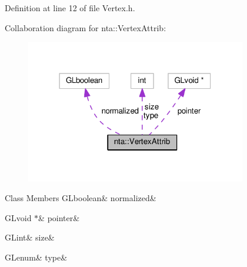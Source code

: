 Definition at line 12 of file Vertex.\+h.



Collaboration diagram for nta\+:\+:Vertex\+Attrib\+:\nopagebreak
\begin{figure}[H]
\begin{center}
\leavevmode
\includegraphics[width=273pt]{d6/d7d/structnta_1_1VertexAttrib__coll__graph}
\end{center}
\end{figure}
\begin{DoxyFields}{Class Members}
\mbox{\label{namespacenta_afe78648a02032d5ba376207cf322320a}} 
GLboolean&
normalized&
\\
\hline

\mbox{\label{namespacenta_a926cbe1d958dd6e72ad7f93e8791d9a4}} 
GLvoid $\ast$&
pointer&
\\
\hline

\mbox{\label{namespacenta_afd253a525c4d086bcc2afa66a2d0118e}} 
GLint&
size&
\\
\hline

\mbox{\label{namespacenta_a625cbe8f28739965a9ec29b9a426465e}} 
GLenum&
type&
\\
\hline

\end{DoxyFields}

